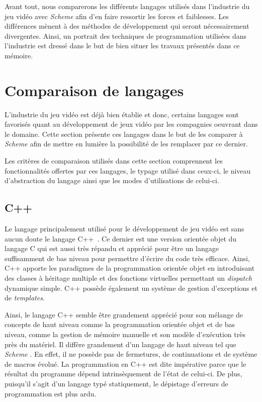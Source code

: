 \documentclass[12pt,twoside,letterpaper,francais]{book}
\newcommand{\Schemelang}{{\textit{Scheme }}}
\begin{document}
Avant tout, nous comparerons les différents langages utilisés dans
l'industrie du jeu vidéo avec \Schemelang afin d'en faire ressortir les
forces et faiblesses. Les différences mènent à des méthodes de
développement qui seront nécessairement divergentes. Ainsi, un
portrait des techniques de programmation utilisées dans l'industrie
est dressé dans le but de bien situer les travaux présentés dans ce
mémoire.


\FloatBarrier
\section{Comparaison de langages}
L'industrie du jeu vidéo est déjà bien établie et donc, certains
langages sont favorisés quant au développement de jeux vidéo par les
compagnies oeuvrant dans le domaine. Cette section présente ces
langages dans le but de les comparer à \Schemelang afin de mettre en
lumière la possibilité de les remplacer par ce dernier.

Les critères de comparaison utilisés dans cette section comprennent
les fonctionnalités offertes par ces langages, le typage utilisé dans
ceux-ci, le niveau d'abstraction du langage ainsi que les modes
d'utilisations de celui-ci. 


\FloatBarrier
\subsection{C++}
Le langage principalement utilisé pour le développement de jeu vidéo
est sans aucun doute le langage C++~\cite{cplusplus}. Ce dernier est
une version orientée objet du langage C qui est aussi très répandu et
apprécié pour être un langage suffisamment de bas niveau pour
permettre d'écrire du code très efficace. Ainsi, C++ apporte les
paradigmes de la programmation orientée objet en introduisant des
classes à héritage multiple et des fonctions virtuelles permettant un
\textit{dispatch} dynamique simple. C++ possède également un système
de gestion d'exceptions et de \textit{templates}.

Ainsi, le langage C++ semble être grandement apprécié pour son mélange
de concepts de haut niveau comme la programmation orientée objet et de
bas niveau, comme la gestion de mémoire manuelle et son modèle
d'exécution très près du matériel. Il diffère grandement d'un langage
de haut niveau tel que \Schemelang. En effet, il ne possède pas de
fermetures, de continuations et de système de macros évolué. La
programmation en C++ est dite impérative parce que le résultat du
programme dépend intrinsèquement de l'état de celui-ci. De plus,
puisqu'il s'agit d'un langage typé statiquement, le dépistage
d'erreurs de programmation est plus ardu.
\end{document}
